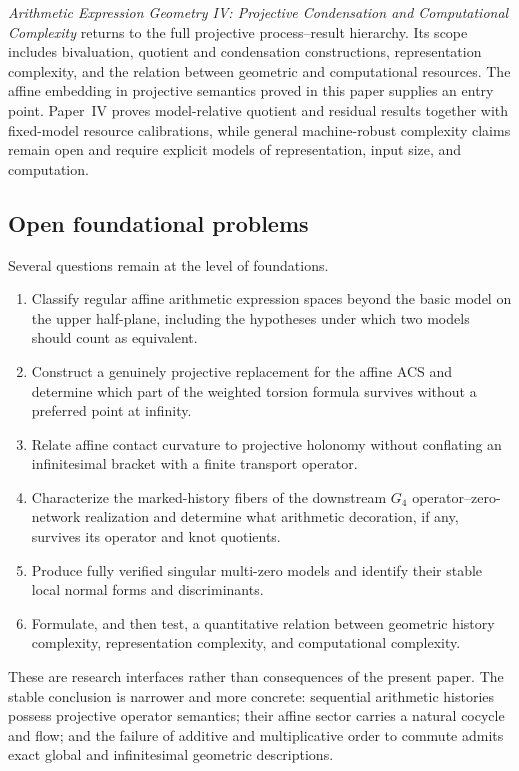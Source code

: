 \emph{Arithmetic Expression Geometry IV: Projective Condensation and
Computational Complexity} returns to the full projective process--result
hierarchy.  Its scope includes bivaluation, quotient and condensation
constructions, representation complexity, and the relation between geometric
and computational resources.  The affine embedding in projective semantics
proved in this paper supplies an entry point. Paper~IV proves model-relative
quotient and residual results together with fixed-model resource calibrations, while
general machine-robust complexity claims remain open and require explicit models of
representation, input size, and computation.

\subsection{Open foundational problems}

Several questions remain at the level of foundations.
\begin{enumerate}
    \item Classify regular affine arithmetic expression spaces beyond the basic
    model on the upper half-plane, including the hypotheses under which two
    models should count as equivalent.
    \item Construct a genuinely projective replacement for the affine ACS and
    determine which part of the weighted torsion formula survives without a
    preferred point at infinity.
    \item Relate affine contact curvature to projective holonomy without
    conflating an infinitesimal bracket with a finite transport operator.
    \item Characterize the marked-history fibers of the downstream
    $G_4$ operator--zero-network realization and determine what arithmetic
    decoration, if any, survives its operator and knot quotients.
    \item Produce fully verified singular multi-zero models and identify their
    stable local normal forms and discriminants.
    \item Formulate, and then test, a quantitative relation between geometric
    history complexity, representation complexity, and computational
    complexity.
\end{enumerate}

These are research interfaces rather than consequences of the present paper.
The stable conclusion is narrower and more concrete: sequential arithmetic
histories possess projective operator semantics; their affine sector carries a
natural cocycle and flow; and the failure of additive and multiplicative order
to commute admits exact global and infinitesimal geometric descriptions.
